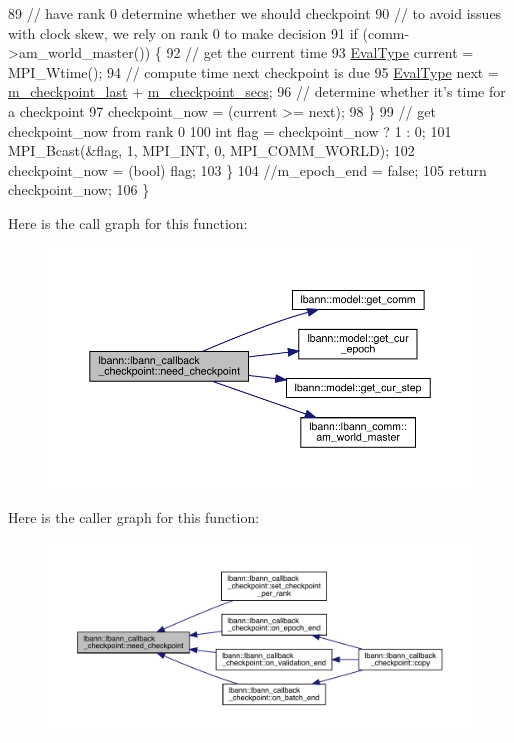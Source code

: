 \begin{DoxyCode}
89     \textcolor{comment}{// have rank 0 determine whether we should checkpoint}
90     \textcolor{comment}{// to avoid issues with clock skew, we rely on rank 0 to make decision}
91     \textcolor{keywordflow}{if} (comm->am\_world\_master()) \{
92       \textcolor{comment}{// get the current time}
93       \hyperlink{base_8hpp_a3266f5ac18504bbadea983c109566867}{EvalType} current = MPI\_Wtime();
94       \textcolor{comment}{// compute time next checkpoint is due}
95       \hyperlink{base_8hpp_a3266f5ac18504bbadea983c109566867}{EvalType} next = \hyperlink{classlbann_1_1lbann__callback__checkpoint_a842304929c265ffa9d285e635fbbbbd7}{m\_checkpoint\_last} + 
      \hyperlink{classlbann_1_1lbann__callback__checkpoint_a285658a96f8546952c9016ef4cc12161}{m\_checkpoint\_secs};
96       \textcolor{comment}{// determine whether it's time for a checkpoint}
97       checkpoint\_now = (current >= next);
98     \}
99     \textcolor{comment}{// get checkpoint\_now from rank 0}
100     \textcolor{keywordtype}{int} flag = checkpoint\_now ? 1 : 0;
101     MPI\_Bcast(&flag, 1, MPI\_INT, 0, MPI\_COMM\_WORLD);
102     checkpoint\_now = (bool) flag;
103   \}
104   \textcolor{comment}{//m\_epoch\_end = false;}
105   \textcolor{keywordflow}{return} checkpoint\_now;
106 \}
\end{DoxyCode}
Here is the call graph for this function\+:\nopagebreak
\begin{figure}[H]
\begin{center}
\leavevmode
\includegraphics[width=350pt]{classlbann_1_1lbann__callback__checkpoint_a2e5f396667ccc45f7203263b06c5e216_cgraph}
\end{center}
\end{figure}
Here is the caller graph for this function\+:\nopagebreak
\begin{figure}[H]
\begin{center}
\leavevmode
\includegraphics[width=350pt]{classlbann_1_1lbann__callback__checkpoint_a2e5f396667ccc45f7203263b06c5e216_icgraph}
\end{center}
\end{figure}
